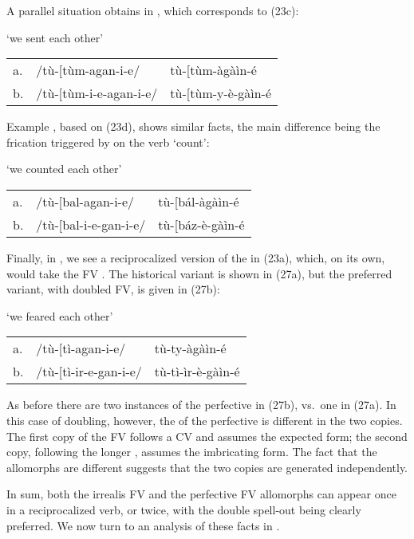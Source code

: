 \documentclass[output=paper,
modfonts
]{LSP/langsci}
\begin{document}
\noindent A parallel situation obtains in , which corresponds to (23c):

\ea \label{ex:hyman:25}`we sent each other'\\
\begin{tabular}{@{}lll}
a. & /tù-{[}tùm-agan-i-e/ & tù-{[}tùm-àgàìn-é \\
b. & /tù-{[}tùm-i-e-agan-i-e/ & tù-{[}tùm-y-è-gàìn-é \\
\end{tabular}
\z

\noindent Example , based on (23d), shows similar facts, the main difference
being the frication triggered by   on the verb 
 `count':

\ea \label{ex:hyman:26}`we counted each other'\\
\begin{tabular}{@{}lll}
a. & /tù-{[}bal-agan-i-e/ & tù-{[}bál-àgàìn-é \\
b. & /tù-{[}bal-i-e-gan-i-e/ & tù-{[}báz-è-gàìn-é \\
\end{tabular}
\z

\noindent Finally, in , we see a reciprocalized version of the  in (23a),
which, on its own, would take the  FV . The
historical variant is shown in (27a), but the preferred variant, with
doubled FV, is given in (27b):

\ea \label{ex:hyman:27} `we feared each other'\\
\begin{tabular}{@{}lll}
a. & /tù-{[}tì-agan-i-e/ & tù-ty-àgàìn-é \\
b. & /tù-{[}tì-ir-e-gan-i-e/ & tù-tì-ìr-è-gàìn-é \\
\end{tabular}
\z

\noindent As before there are two instances of the perfective in (27b), vs.\ one in
(27a). In this case of doubling, however, the  of the
perfective is different in the two copies. The first copy of the FV
follows a CV  and assumes the expected  form; the second
copy, following the longer , assumes the imbricating
 form. The fact that the allomorphs are different suggests
that the two copies are generated independently.

In sum, both the irrealis  FV and the perfective FV allomorphs
can appear once in a reciprocalized verb, or twice, with the double
spell-out being clearly preferred. We now turn to an analysis of these
facts in .
\end{document}
